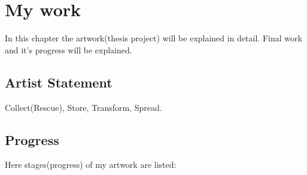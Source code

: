 \chapter{My work}
In this chapter the artwork(thesis project) will be explained in detail. Final work and it's progress will be explained. 

\section{Artist Statement}
Collect(Rescue), Store, Transform, Spread.

\section{Progress}
Here stages(progress) of my artwork are listed:
